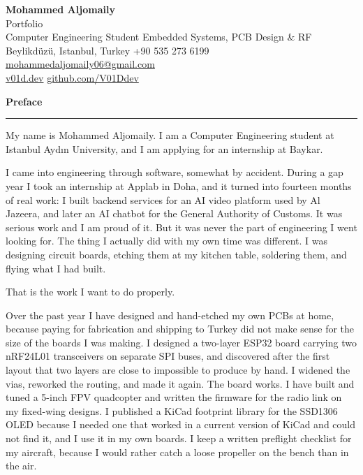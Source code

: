 \documentclass[11pt,a4paper]{article}
\newcommand{\entry}[2]{%
  \vspace{6pt}%
  {\large\bfseries #1}\hfill{\itshape\small #2}\par
  \vspace{2pt}\hrule\vspace{4pt}%
}
\begin{document}
\begin{center}
    {\LARGE \textbf{Mohammed Aljomaily}}\\[4pt]
    {\large Portfolio}\\[6pt]
    {\small Computer Engineering Student \textbar{} Embedded Systems, PCB Design \& RF}\\[3pt]
    {\small Beylikd\"uz\"u, Istanbul, Turkey \textbar{} +90 535 273 6199 \textbar{}
    \href{mailto:mohammedaljomaily06@gmail.com}{mohammedaljomaily06@gmail.com}}\\[2pt]
    {\small \href{https://v01d.dev}{v01d.dev} \textbar{} \href{https://github.com/V01Ddev}{github.com/V01Ddev}}
\end{center}

\entry{Preface}{}

My name is Mohammed Aljomaily. I am a Computer Engineering student at Istanbul
Ayd{\i}n University, and I am applying for an internship at Baykar.

I came into engineering through software, somewhat by accident. During a gap
year I took an internship at Applab in Doha, and it turned into fourteen months
of real work: I built backend services for an AI video platform used by Al
Jazeera, and later an AI chatbot for the General Authority of Customs. It was
serious work and I am proud of it. But it was never the part of engineering I
went looking for. The thing I actually did with my own time was different. I was
designing circuit boards, etching them at my kitchen table, soldering them, and
flying what I had built.

That is the work I want to do properly.

Over the past year I have designed and hand-etched my own PCBs at home, because
paying for fabrication and shipping to Turkey did not make sense for the size of
the boards I was making. I designed a two-layer ESP32 board carrying two
nRF24L01 transceivers on separate SPI buses, and discovered after the first
layout that two layers are close to impossible to produce by hand. I widened the
vias, reworked the routing, and made it again. The board works. I have built and
tuned a 5-inch FPV quadcopter and written the firmware for the radio link on my
fixed-wing designs. I published a KiCad footprint library for the SSD1306 OLED
because I needed one that worked in a current version of KiCad and could not
find it, and I use it in my own boards. I keep a written preflight checklist for
my aircraft, because I would rather catch a loose propeller on the bench than in
the air.
\end{document}
